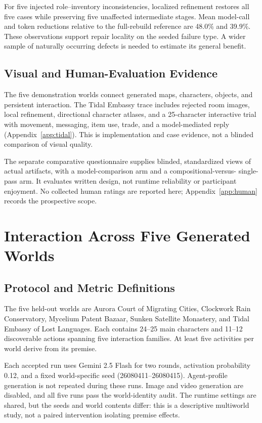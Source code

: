 For five injected role--inventory inconsistencies, localized refinement
restores all five cases while preserving five unaffected intermediate stages.
Mean model-call and token reductions relative to the full-rebuild reference
are 48.0\% and 39.9\%. These observations support repair locality on the seeded
failure type. A wider sample of naturally occurring defects is needed to
estimate its general benefit.

\subsection{Visual and Human-Evaluation Evidence}
The five demonstration worlds connect generated maps, characters, objects,
and persistent interaction. The Tidal Embassy trace includes rejected room
images, local refinement, directional character atlases, and a 25-character
interactive trial with movement, messaging, item use, trade, and a
model-mediated reply (Appendix~\ref{app:tidal}). This is implementation and
case evidence, not a blinded comparison of visual quality.

The separate comparative questionnaire supplies blinded, standardized views
of actual artifacts, with a model-comparison arm and a compositional-versus-
single-pass arm. It evaluates written design, not runtime reliability or
participant enjoyment. No collected human ratings are reported here;
Appendix~\ref{app:human} records the prospective scope.

\section{Interaction Across Five Generated Worlds}
\label{sec:interaction}

\subsection{Protocol and Metric Definitions}
The five held-out worlds are Aurora Court of Migrating Cities, Clockwork Rain
Conservatory, Mycelium Patent Bazaar, Sunken Satellite Monastery, and Tidal
Embassy of Lost Languages. Each contains 24--25 main characters and 11--12
discoverable actions spanning five interaction families. At least five
activities per world derive from its premise.

Each accepted run uses Gemini 2.5 Flash for two rounds, activation probability
0.12, and a fixed world-specific seed (26080411--26080415). Agent-profile
generation is not repeated during these runs. Image and video generation are
disabled, and all five runs pass the world-identity audit. The runtime settings
are shared, but the seeds and world contents differ: this is a descriptive
multiworld study, not a paired intervention isolating premise effects.

